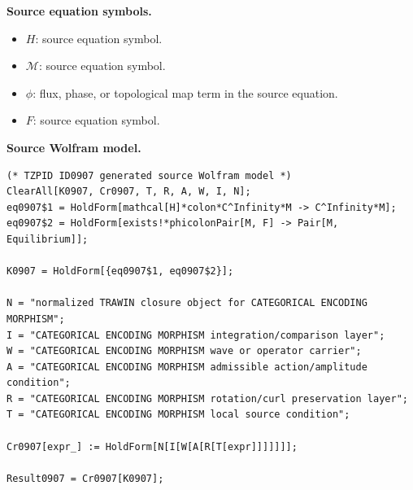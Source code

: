 \begin{minipage}[t]{0.49\linewidth}
\begingroup
\small
\raggedright
\textbf{Source equation symbols.}\par
\begin{itemize}[leftmargin=1.35em,itemsep=1pt,topsep=1pt,parsep=0pt]
    \item $H$: source equation symbol.
    \item $\mathcal{M}$: source equation symbol.
    \item $\phi$: flux, phase, or topological map term in the source equation.
    \item $F$: source equation symbol.
\end{itemize}
\endgroup
\end{minipage}\hfill
\begin{minipage}[t]{0.47\linewidth}
\begingroup
\scriptsize
\raggedright
\textbf{Source Wolfram model.}\par
\begin{Verbatim}[fontsize=\tiny,breaklines=true,breakanywhere=true]
(* TZPID ID0907 generated source Wolfram model *)
ClearAll[K0907, Cr0907, T, R, A, W, I, N];
eq0907$1 = HoldForm[mathcal[H]*colon*C^Infinity*M -> C^Infinity*M];
eq0907$2 = HoldForm[exists!*phicolonPair[M, F] -> Pair[M, Equilibrium]];

K0907 = HoldForm[{eq0907$1, eq0907$2}];

N = "normalized TRAWIN closure object for CATEGORICAL ENCODING MORPHISM";
I = "CATEGORICAL ENCODING MORPHISM integration/comparison layer";
W = "CATEGORICAL ENCODING MORPHISM wave or operator carrier";
A = "CATEGORICAL ENCODING MORPHISM admissible action/amplitude condition";
R = "CATEGORICAL ENCODING MORPHISM rotation/curl preservation layer";
T = "CATEGORICAL ENCODING MORPHISM local source condition";

Cr0907[expr_] := HoldForm[N[I[W[A[R[T[expr]]]]]]];

Result0907 = Cr0907[K0907];
\end{Verbatim}
\endgroup
\end{minipage}

